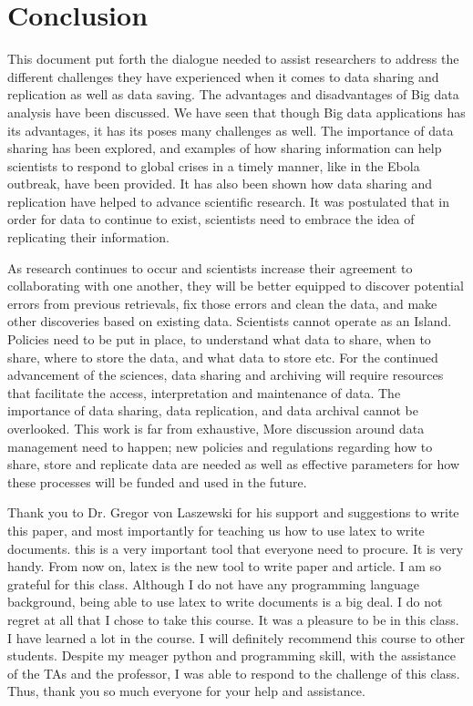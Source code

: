\documentclass[sigconf]{acmart}
\begin{document}
\section{Conclusion}

This document put forth the dialogue needed to assist researchers to address the different challenges they have experienced when it comes to data sharing and replication as well as data saving. The advantages and disadvantages of Big data analysis have been discussed. We have seen that though Big data applications has its advantages, it has its poses many challenges as well. The importance of data sharing has been explored, and examples of how sharing information can help scientists to respond to global crises in a timely manner, like in the Ebola outbreak, have been provided. It has also been shown how data sharing and replication have helped to advance scientific research. It was postulated that in order for data to continue to exist, scientists need to embrace the idea of replicating their information. 

As research continues to occur and scientists increase their agreement to collaborating with one another, they will be better equipped to discover potential errors from previous retrievals, fix those errors and clean the data, and make other discoveries based on existing data. Scientists cannot operate as an Island. Policies need to be put in place, to understand what data to share, when to share, where to store the data, and what data to store etc. For the continued advancement of the sciences, data sharing and archiving will require resources that facilitate the access, interpretation and maintenance of data. The importance of data sharing, data replication, and data archival cannot be overlooked. This work is far from exhaustive, More discussion around data management need to happen; new policies and regulations regarding how to share, store and replicate data  are needed as well as effective parameters for how these processes will be funded and used in the future.



\begin{acks}

  Thank you to Dr. Gregor von Laszewski for his support and suggestions to write this paper, and most importantly for teaching us how to use latex to write documents. this is a very important tool that everyone need to procure. It is very handy. From now on, latex is the new tool to write paper and article. I am so grateful for this class. Although I do not have any programming language background, being able to use latex to write documents is a big deal. I do not regret at all that I chose to take this course. It was a pleasure to be in this class. I have learned a lot in the course. I will definitely recommend this course to other students. Despite my meager python and programming skill, with the assistance of the TAs and the professor, I was able to respond to the challenge of this class. Thus, thank you so much everyone for your help and assistance.  

\end{acks}

\appendix



\end{document}
